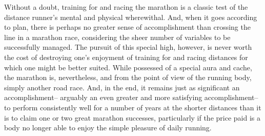 Without a doubt, training for and racing the marathon is a classic test of the distance runner's mental and physical wherewithal. And, when it goes according to plan, there is perhaps no greater sense of accomplishment than crossing the line in a marathon race, considering the sheer number of variables to be successfully managed. The pursuit of this special high, however, is never worth the cost of destroying one's enjoyment of training for and racing distances for which one might be better suited. While possessed of a special aura and cache, the marathon is, nevertheless, and from the point of view of the running body, simply another road race. And, in the end, it remains just as significant an accomplishment-- arguably an even greater and more satisfying accomplishment-- to perform consistently well for a number of years at the shorter distances than it is to claim one or two great marathon successes, particularly if the price paid is a body no longer able to enjoy the simple pleasure of daily running.





